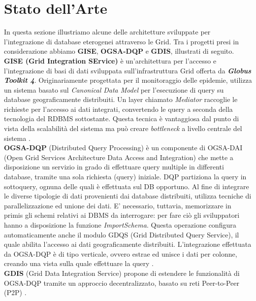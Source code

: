 \documentclass[11pt]{article}
\begin{document}
\section{Stato dell'Arte}
In questa sezione illustriamo alcune delle architetture sviluppate per l'integrazione di database eterogenei attraverso le Grid. Tra i progetti presi in considerazione abbiamo \textbf{GISE}, \textbf{OGSA-DQP} e \textbf{GDIS}, illustrati di seguito. \\

\textbf{GISE (Grid Integration SErvice)} è un'architettura per l'accesso e l'integrazione di basi di dati sviluppata sull'infrastruttura Grid offerta da \textbf{\emph{Globus Toolkit 4}}. Originariamente progettata per il monitoraggio delle epidemie, utilizza un sistema basato sul \emph{Canonical Data Model} per l'esecuzione di query su database geograficamente distribuiti. Un layer chiamato \emph{Mediator} raccoglie le richieste per l'accesso ai dati integrati, convertendo le query a seconda della tecnologia del RDBMS sottostante. Questa tecnica è vantaggiosa dal punto di vista della scalabilità del sistema ma può creare \emph{bottleneck} a livello centrale del sistema \cite{archgrid}. \\

\textbf{OGSA-DQP} (Distributed Query Processing) è un componente di OGSA-DAI (Open Grid Services Architecture Data Access and Integration) che mette a disposizione un servizio in grado di effettuare query multiple in differenti database, tramite una sola richiesta (query) iniziale. DQP partiziona la query in sottoquery, ognuna delle quali è effettuata sul DB opportuno. Al fine di integrare le diverse tipologie di dati provenienti dai database distribuiti, utilizza tecniche di parallelizzazione ed unione dei dati. E' necessario, tuttavia, memorizzare in primis gli schemi relativi ai DBMS da interrogare: per fare ciò gli sviluppatori hanno a disposizione la funzione \emph{ImportSchema}. Questa operazione configura automaticamente anche il modulo GDQS (Grid Distributed Query Service), il quale abilita l'accesso ai dati geograficamente distribuiti. L'integrazione effettuata da OGSA-DQP è di tipo verticale, ovvero estrae ed unisce i dati per colonne, creando una vista sulla quale effettuare la query \cite{archgrid}.\\

\textbf{GDIS} (Grid Data Integration Service) propone di estendere le funzionalità di OGSA-DQP tramite un approccio decentralizzato, basato su reti Peer-to-Peer (P2P) \cite{comito2004gdis}.
\end{document}
